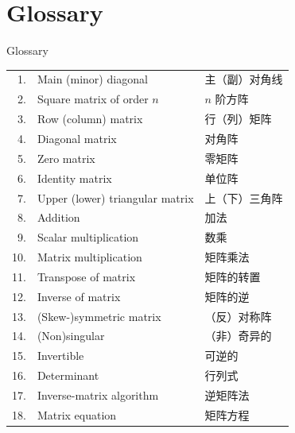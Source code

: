 \section[Glossary]{Glossary}
\begin{frame}{Glossary}
\scriptsize
\renewcommand{\arraystretch}{1.13}
\begin{tabular}{r l l}
1.&Main (minor) diagonal&主（副）对角线\\
2.&Square matrix of order $n$&$n$ 阶方阵\\
3.&Row (column) matrix&行（列）矩阵\\
4.&Diagonal matrix&对角阵\\
5.&Zero matrix&零矩阵\\
6.&Identity matrix&单位阵\\
7.&Upper (lower) triangular matrix&上（下）三角阵\\
8.&Addition&加法\\
9.&Scalar multiplication&数乘\\
10.&Matrix multiplication&矩阵乘法\\
11.&Transpose of matrix&矩阵的转置\\
12.&Inverse of matrix&矩阵的逆\\
13.&(Skew-)symmetric matrix&（反）对称阵\\
14.&(Non)singular&（非）奇异的\\
15.&Invertible&可逆的\\
16.&Determinant&行列式\\
17.&Inverse-matrix algorithm&逆矩阵法\\
18.&Matrix equation&矩阵方程
\end{tabular}
\end{frame}
